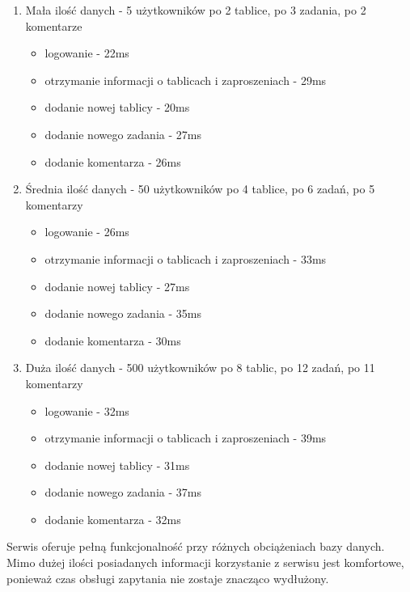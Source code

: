 \documentclass[12pt]{report}
\begin{document}
\begin{enumerate} 
	\item
	Mała ilość danych - 5 użytkowników po 2 tablice, po 3 zadania, po 2 komentarze
	\begin{itemize}
	  \item logowanie - 22ms
	  \item otrzymanie informacji o tablicach i zaproszeniach - 29ms
	  \item dodanie nowej tablicy - 20ms
	  \item dodanie nowego zadania - 27ms
	  \item dodanie komentarza - 26ms
	\end{itemize}
	\item
	Średnia ilość danych - 50 użytkowników po 4 tablice, po 6 zadań, po 5 komentarzy
	\begin{itemize}
	  \item logowanie - 26ms
	  \item otrzymanie informacji o tablicach i zaproszeniach - 33ms
	  \item dodanie nowej tablicy - 27ms
	  \item dodanie nowego zadania - 35ms
	  \item dodanie komentarza - 30ms
	\end{itemize}
	\item
	Duża ilość danych - 500 użytkowników po 8 tablic, po 12 zadań, po 11 komentarzy
	\begin{itemize}
	  \item logowanie - 32ms
	  \item otrzymanie informacji o tablicach i zaproszeniach - 39ms
	  \item dodanie nowej tablicy - 31ms
	  \item dodanie nowego zadania - 37ms
	  \item dodanie komentarza - 32ms
	\end{itemize}
\end{enumerate} 
Serwis oferuje pełną funkcjonalność przy różnych obciążeniach bazy danych. Mimo dużej ilości posiadanych informacji korzystanie z serwisu jest komfortowe, ponieważ czas obsługi zapytania nie zostaje znacząco wydłużony.
\end{document}
